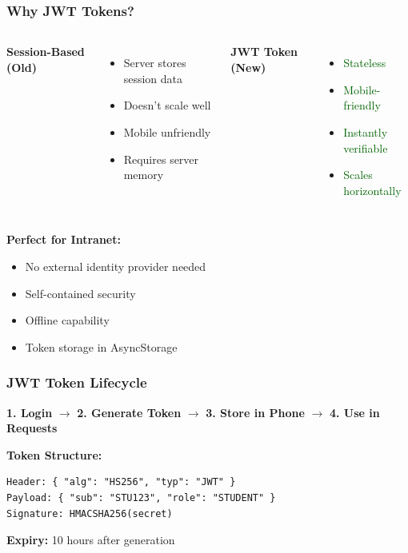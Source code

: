 \documentclass[11pt]{beamer}
\begin{document}
\begin{frame}
\frametitle{Why JWT Tokens?}
\begin{columns}[T]
\textbf{Session-Based (Old)}
\begin{itemize}
    \item Server stores session data
    \item Doesn't scale well
    \item Mobile unfriendly
    \item Requires server memory
\end{itemize}

\textbf{JWT Token (New)}
\begin{itemize}
    \item \textcolor{darkgreen}{Stateless}
    \item \textcolor{darkgreen}{Mobile-friendly}
    \item \textcolor{darkgreen}{Instantly verifiable}
    \item \textcolor{darkgreen}{Scales horizontally}
\end{itemize}
\end{columns}

\vspace{1cm}
\textbf{Perfect for Intranet:}
\begin{itemize}
    \item No external identity provider needed
    \item Self-contained security
    \item Offline capability
    \item Token storage in AsyncStorage
\end{itemize}
\end{frame}

\begin{frame}
\frametitle{JWT Token Lifecycle}
\begin{center}
\textbf{1. Login}
$\rightarrow$
\textbf{2. Generate Token}
$\rightarrow$
\textbf{3. Store in Phone}
$\rightarrow$
\textbf{4. Use in Requests}
\end{center}

\vspace{1cm}
\textbf{Token Structure:}
\begin{lstlisting}
Header: { "alg": "HS256", "typ": "JWT" }
Payload: { "sub": "STU123", "role": "STUDENT" }
Signature: HMACSHA256(secret)
\end{lstlisting}

\vspace{0.5cm}
\textbf{Expiry:} 10 hours after generation
\end{frame}
\end{document}
